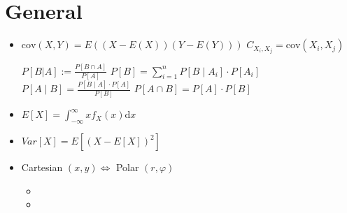 
\section{General}
\begin{itemize}
    \item $\mathrm{cov}(X, Y) = E((X - E(X))(Y - E(Y)))$
     $C_{X_i,X_j} = \mathrm{cov}(X_i, X_j)$
        \\ 
     $P[B | A] := \frac{P[B \cap A]}{P[A]}$
     $P[B] = \sum_{i=1}^n P[B \mid A_i] \cdot P[A_i]$
     $P[A \mid B] = \frac{P[B \mid A]\cdot P[A]}{P[B]}$
     $P[A \cap B] = P[A] \cdot P[B]$
    \item $E[X] = \int_{-\infty}^{\infty} x f_X(x) \mathrm{d}x$
    \item $Var[X] = E[(X - E[X])^2]$
    \item Cartesian $(x, y) \Leftrightarrow$ Polar $(r, \varphi)$
        \begin{itemize}
            \item
            \item
        \end{itemize}
\end{itemize}
